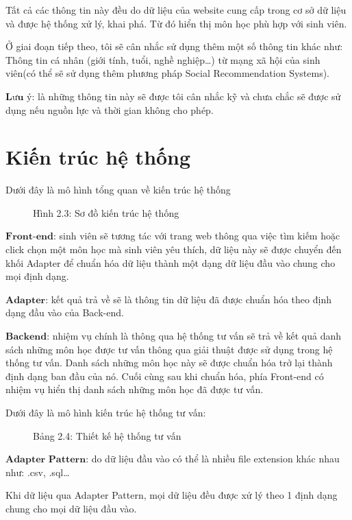 \documentclass[a4paper,12pt,numbered,print,index,custombib, oneside, custommargin]{report}
\begin{document}
Tất cả các thông tin này đều do dữ liệu của website cung cấp trong cơ sở dữ liệu và được hệ thống xử lý, khai phá. Từ đó hiển thị môn học phù hợp với sinh viên.

Ở giai đoạn tiếp theo, tôi sẽ cân nhắc sử dụng thêm một số thông tin khác như: Thông tin cá nhân (giới tính, tuổi, nghề nghiệp…) từ mạng xã hội của sinh viên(có thể sẽ sử dụng thêm phương pháp Social Recommendation Systems).

$\textbf{Lưu ý}$: là những thông tin này sẽ được tôi cân nhắc kỹ và chưa chắc sẽ được sử dụng nếu nguồn lực và thời gian không cho phép.
\pagebreak

\section{Kiến trúc hệ thống}
Dưới đây là mô hình tổng quan về kiến trúc hệ thống

\begin{figure}[h]
\centering
\caption{Hình 2.3: Sơ đồ kiến trúc hệ thống}
\end{figure}

$\textbf{Front-end}$: sinh viên sẽ tương tác với trang web thông qua việc tìm kiếm hoặc click chọn một môn học mà sinh viên yêu thích, dữ liệu này sẽ được chuyển đến khối Adapter để chuẩn hóa dữ liệu thành một dạng dữ liệu đầu vào chung cho mọi định dạng. 

$\textbf{Adapter}$: kết quả trả về sẽ là thông tin dữ liệu đã được chuẩn hóa theo định dạng đầu vào của Back-end.

$\textbf{Backend}$: nhiệm vụ chính là thông qua hệ thống tư vấn sẽ trả về kết quả danh sách những môn học được tư vấn thông qua giải thuật được sử dụng trong hệ thống tư vấn. Danh sách những môn học này sẽ được chuẩn hóa trở lại thành định dạng ban đầu của nó. Cuối cùng sau khi chuẩn hóa, phía Front-end có nhiệm vụ hiển thị danh sách những môn học đã được tư vấn.

Dưới đây là mô hình kiến trúc hệ thống tư vấn:
\begin{figure}[h]
\centering
\caption{Bảng 2.4: Thiết kế hệ thống tư vấn}
\end{figure}

$\textbf{Adapter Pattern}$: do dữ liệu đầu vào có thể là nhiều file extension khác nhau như: .csv, .sql…

Khi dữ liệu qua Adapter Pattern, mọi dữ liệu đều được xử lý theo 1 định dạng chung cho mọi dữ liệu đầu vào.
\pagebreak
\end{document}
